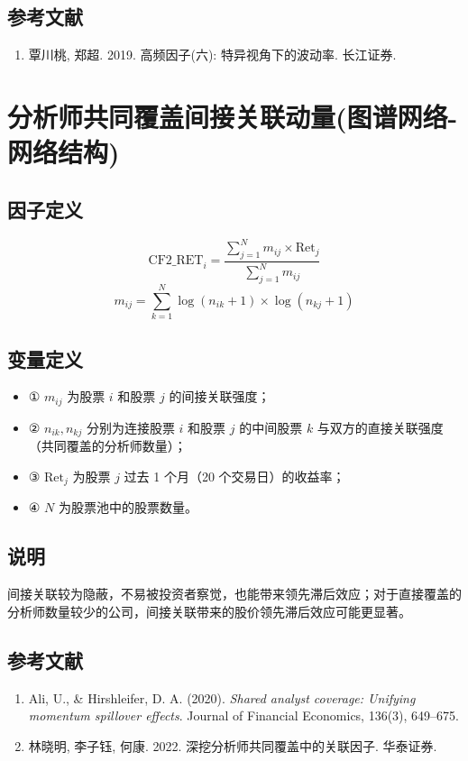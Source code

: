 \documentclass{article}
\begin{document}
\subsection{参考文献}
\begin{enumerate}
    \item 覃川桃, 郑超. 2019. 高频因子(六): 特异视角下的波动率. 长江证券.
\end{enumerate}

\section{分析师共同覆盖间接关联动量(图谱网络-网络结构)}

\subsection{因子定义}

\begin{equation}
    \mathrm{CF2\_RET}_i = \frac{\sum_{j=1}^{N} m_{ij} \times \mathrm{Ret}_j}{\sum_{j=1}^{N} m_{ij}}
\end{equation}
\begin{equation}
    m_{ij} = \sum_{k=1}^{N} \log(n_{ik} + 1) \times \log(n_{kj} + 1)
\end{equation}

\subsection{变量定义}
\begin{itemize}
    \item ① \( m_{ij} \) 为股票 \( i \) 和股票 \( j \) 的间接关联强度；
    \item ② \( n_{ik}, n_{kj} \) 分别为连接股票 \( i \) 和股票 \( j \) 的中间股票 \( k \) 与双方的直接关联强度（共同覆盖的分析师数量）；
    \item ③ \( \mathrm{Ret}_j \) 为股票 \( j \) 过去 1 个月（20 个交易日）的收益率；
    \item ④ \( N \) 为股票池中的股票数量。
\end{itemize}

\subsection{说明}
间接关联较为隐蔽，不易被投资者察觉，也能带来领先滞后效应；对于直接覆盖的分析师数量较少的公司，间接关联带来的股价领先滞后效应可能更显著。

\subsection{参考文献}
\begin{enumerate}
    \item Ali, U., \& Hirshleifer, D. A. (2020). \textit{Shared analyst coverage: Unifying momentum spillover effects}. Journal of Financial Economics, 136(3), 649–675.
    \item 林晓明, 李子钰, 何康. 2022. 深挖分析师共同覆盖中的关联因子. 华泰证券.
\end{enumerate}
\end{document}
